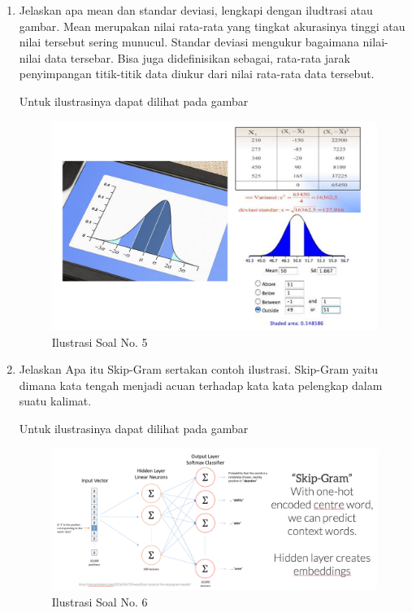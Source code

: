 \begin{enumerate}
\item Jelaskan apa mean dan standar deviasi, lengkapi dengan iludtrasi atau gambar.
\subitem Mean merupakan nilai rata-rata yang tingkat akurasinya tinggi atau nilai tersebut sering munucul. Standar deviasi mengukur bagaimana nilai-nilai data tersebar. Bisa juga didefinisikan sebagai, rata-rata jarak penyimpangan titik-titik data diukur dari nilai rata-rata data tersebut.
\par Untuk ilustrasinya dapat dilihat pada gambar 
\begin{figure}[ht]
	\centerline{\includegraphics[width=1\textwidth]{figures/andi/L5.PNG}}
	\caption{Ilustrasi Soal No. 5}
	
\end{figure}

\item Jelaskan Apa itu Skip-Gram sertakan contoh ilustrasi.
\subitem Skip-Gram yaitu dimana kata tengah menjadi acuan terhadap kata kata pelengkap dalam suatu kalimat.
\par Untuk ilustrasinya dapat dilihat pada gambar 
\begin{figure}[ht]
	\centerline{\includegraphics[width=1\textwidth]{figures/andi/L6.PNG}}
	\caption{Ilustrasi Soal No. 6}
	
\end{figure}
\end{enumerate}


